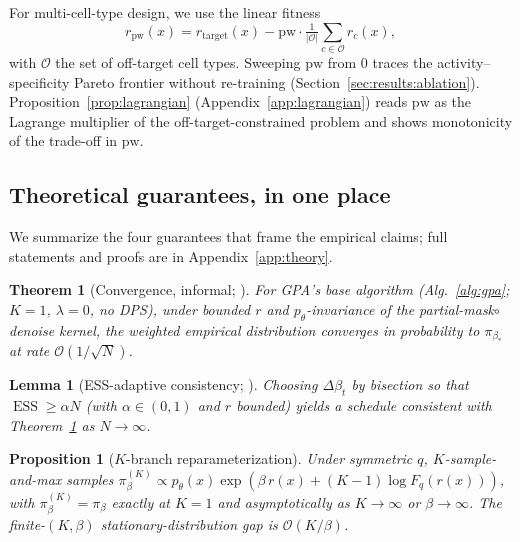 \documentclass{article}
\newtheorem{theorem}{Theorem}
\newtheorem{proposition}{Proposition}
\newtheorem{lemma}{Lemma}
\theoremstyle{definition}
\theoremstyle{remark}
\newcommand{\gpa}{\textsc{GPA}\xspace}
\newcommand{\ESS}{\operatorname{ESS}}
\begin{document}
For multi-cell-type design, we use the linear fitness
\begin{equation}\label{eq:fitness}
    r_{\mathrm{pw}}(x) = r_{\mathrm{target}}(x) - \mathrm{pw}\cdot\tfrac{1}{|\mathcal{O}|}\sum_{c\in\mathcal{O}}r_c(x),
\end{equation}
with $\mathcal{O}$ the set of off-target cell types. Sweeping $\mathrm{pw}$ from $0$ traces the activity–specificity Pareto frontier without re-training (Section~\ref{sec:results:ablation}). Proposition~\ref{prop:lagrangian} (Appendix~\ref{app:lagrangian}) reads $\mathrm{pw}$ as the Lagrange multiplier of the off-target-constrained problem and shows monotonicity of the trade-off in $\mathrm{pw}$.

\subsection{Theoretical guarantees, in one place}\label{sec:method:theory}

We summarize the four guarantees that frame the empirical claims; full statements and proofs are in Appendix~\ref{app:theory}.

\begin{theorem}[Convergence, informal; \citet{delmoral2006smc}]\label{thm:smc}
For \gpa{}'s base algorithm (Alg.~\ref{alg:gpa}; $K\!=\!1$, $\lambda\!=\!0$, no DPS), under bounded $r$ and $p_\theta$-invariance of the partial-mask$\circ$denoise kernel, the weighted empirical distribution converges in probability to $\pi_{\beta_*}$ at rate $\mathcal{O}(1/\sqrt{N})$.
\end{theorem}

\begin{lemma}[ESS-adaptive consistency; \citealt{delmoral2012adaptive}]\label{lem:ess}
Choosing $\Delta\beta_t$ by bisection so that $\ESS\!\geq\!\alpha N$ (with $\alpha\!\in\!(0,1)$ and $r$ bounded) yields a schedule consistent with Theorem~\ref{thm:smc} as $N\!\to\!\infty$.
\end{lemma}

\begin{proposition}[$K$-branch reparameterization]\label{prop:K}
Under symmetric $q$, $K$-sample-and-max samples $\pi_\beta^{(K)}\propto p_\theta(x)\exp(\beta\,r(x)+(K\!-\!1)\log F_q(r(x)))$, with $\pi_\beta^{(K)}\!=\!\pi_\beta$ exactly at $K\!=\!1$ and asymptotically as $K\!\to\!\infty$ or $\beta\!\to\!\infty$. The finite-$(K,\beta)$ stationary-distribution gap is $\mathcal{O}(K/\beta)$.
\end{proposition}
\end{document}
